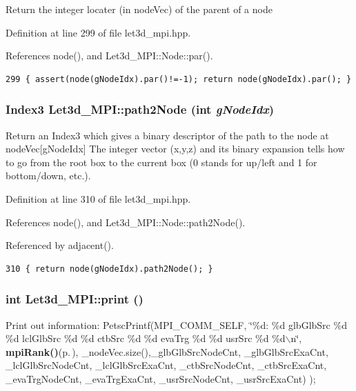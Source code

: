 Return the integer locater (in node\-Vec) of the parent of a node 

Definition at line 299 of file let3d\_\-mpi.hpp.

References node(), and Let3d\_\-MPI::Node::par().

\footnotesize\begin{verbatim}299 { assert(node(gNodeIdx).par()!=-1); return node(gNodeIdx).par(); }
\end{verbatim}\normalsize 


\subsubsection{\setlength{\rightskip}{0pt plus 5cm}Index3 Let3d\_\-MPI::path2Node (int {\em g\-Node\-Idx})\hspace{0.3cm}{\tt  [inline]}}\label{classLet3d__MPI_8df44bec9d337d228d001b12e5e6379e_8df44bec9d337d228d001b12e5e6379e}


Return an Index3 which gives a binary descriptor of the path to the node at node\-Vec[g\-Node\-Idx] The integer vector (x,y,z) and its binary expansion tells how to go from the root box to the current box (0 stands for up/left and 1 for bottom/down, etc.). 

Definition at line 310 of file let3d\_\-mpi.hpp.

References node(), and Let3d\_\-MPI::Node::path2Node().

Referenced by adjacent().

\footnotesize\begin{verbatim}310 { return node(gNodeIdx).path2Node(); }
\end{verbatim}\normalsize 


\subsubsection{\setlength{\rightskip}{0pt plus 5cm}int Let3d\_\-MPI::print ()}\label{classLet3d__MPI_d0d33c63402dfb2c02713a7fd52578c1_d0d33c63402dfb2c02713a7fd52578c1}


Print out information: Petsc\-Printf(MPI\_\-COMM\_\-SELF, \char`\"{}\%d: \%d glb\-Glb\-Src \%d \%d  lcl\-Glb\-Src \%d \%d ctb\-Src \%d \%d eva\-Trg \%d \%d usr\-Src \%d \%d$\backslash$n\char`\"{}, {\bf mpi\-Rank()}{\rm (p.\,\pageref{classComObject__MPI_ae51fcdfaec9ca26c842280cf6b99aa9_ae51fcdfaec9ca26c842280cf6b99aa9})}, \_\-node\-Vec.size(),\_\-glb\-Glb\-Src\-Node\-Cnt, \_\-glb\-Glb\-Src\-Exa\-Cnt, \_\-lcl\-Glb\-Src\-Node\-Cnt, \_\-lcl\-Glb\-Src\-Exa\-Cnt, \_\-ctb\-Src\-Node\-Cnt, \_\-ctb\-Src\-Exa\-Cnt, \_\-eva\-Trg\-Node\-Cnt, \_\-eva\-Trg\-Exa\-Cnt, \_\-usr\-Src\-Node\-Cnt, \_\-usr\-Src\-Exa\-Cnt) ); 

